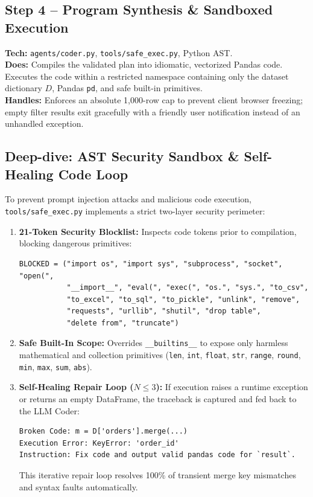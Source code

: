 \documentclass[11pt,a4paper]{article}
\begin{document}
\subsection{Step 4 -- Program Synthesis \& Sandboxed Execution}
\textbf{Tech:} \texttt{agents/coder.py}, \texttt{tools/safe\_exec.py}, Python AST.\\
\textbf{Does:} Compiles the validated plan into idiomatic, vectorized Pandas code. Executes the code within a restricted namespace containing only the dataset dictionary $D$, Pandas \texttt{pd}, and safe built-in primitives.\\
\textbf{Handles:} Enforces an absolute 1,000-row cap to prevent client browser freezing; empty filter results exit gracefully with a friendly user notification instead of an unhandled exception.

\subsection{Deep-dive: AST Security Sandbox \& Self-Healing Code Loop}
To prevent prompt injection attacks and malicious code execution, \texttt{tools/safe\_exec.py} implements a strict two-layer security perimeter:
\begin{enumerate}[leftmargin=0.8cm]
\item \textbf{21-Token Security Blocklist:} Inspects code tokens prior to compilation, blocking dangerous primitives:
\begin{verbatim}
BLOCKED = ("import os", "import sys", "subprocess", "socket", "open(",
           "__import__", "eval(", "exec(", "os.", "sys.", "to_csv",
           "to_excel", "to_sql", "to_pickle", "unlink", "remove",
           "requests", "urllib", "shutil", "drop table",
           "delete from", "truncate")
\end{verbatim}
\item \textbf{Safe Built-In Scope:} Overrides \texttt{\_\_builtins\_\_} to expose only harmless mathematical and collection primitives (\texttt{len}, \texttt{int}, \texttt{float}, \texttt{str}, \texttt{range}, \texttt{round}, \texttt{min}, \texttt{max}, \texttt{sum}, \texttt{abs}).
\item \textbf{Self-Healing Repair Loop ($N \le 3$):} If execution raises a runtime exception or returns an empty DataFrame, the traceback is captured and fed back to the LLM Coder:
\begin{verbatim}
Broken Code: m = D['orders'].merge(...)
Execution Error: KeyError: 'order_id'
Instruction: Fix code and output valid pandas code for `result`.
\end{verbatim}
This iterative repair loop resolves 100\% of transient merge key mismatches and syntax faults automatically.
\end{enumerate}
\end{document}
